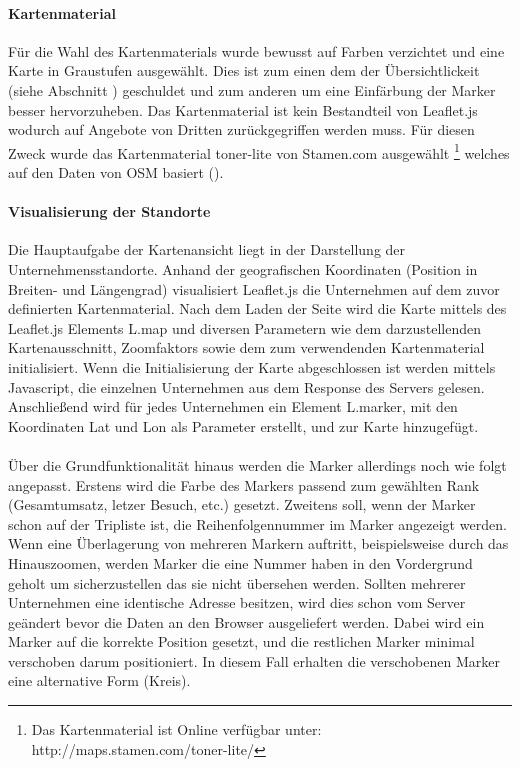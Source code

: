 \documentclass[Bachelorarbeit.tex]{subfiles}
\begin{document}
\paragraph{Kartenmaterial}
Für die Wahl des Kartenmaterials wurde bewusst auf Farben verzichtet und eine Karte in Graustufen ausgewählt. 
Dies ist zum einen dem der Übersichtlickeit (siehe Abschnitt ) geschuldet und zum anderen um eine Einfärbung der Marker besser hervorzuheben.
Das Kartenmaterial ist kein Bestandteil von Leaflet.js wodurch auf Angebote von Dritten zurückgegriffen werden muss.
Für diesen Zweck wurde das Kartenmaterial toner-lite von Stamen.com ausgewählt
	\footnote{Das Kartenmaterial ist Online verfügbar unter: http://maps.stamen.com/toner-lite/}  
welches auf den Daten von \ac{OSM} basiert (\cite[vgl.][]{Stamen}). 


\paragraph{Visualisierung der Standorte}
Die Hauptaufgabe der Kartenansicht liegt in der Darstellung der Unternehmensstandorte.
Anhand der geografischen Koordinaten (Position in Breiten- und Längengrad) visualisiert Leaflet.js die Unternehmen auf dem zuvor definierten Kartenmaterial. 
Nach dem Laden der Seite wird die Karte mittels des Leaflet.js Elements L.map und diversen Parametern wie dem darzustellenden Kartenausschnitt, Zoomfaktors sowie dem zum verwendenden Kartenmaterial initialisiert.
Wenn die Initialisierung der Karte abgeschlossen ist werden mittels Javascript, die einzelnen Unternehmen aus dem Response des Servers gelesen. 
Anschließend wird für jedes Unternehmen ein Element L.marker, mit den Koordinaten Lat und Lon als Parameter erstellt, und zur Karte hinzugefügt. \\
\\
Über die Grundfunktionalität hinaus werden die Marker allerdings noch wie folgt angepasst.
Erstens wird die Farbe des Markers passend zum gewählten Rank (Gesamtumsatz, letzer Besuch, etc.) gesetzt.
Zweitens soll, wenn der Marker schon auf der Tripliste ist, die Reihenfolgennummer im Marker angezeigt werden.
Wenn eine Überlagerung von mehreren Markern auftritt, beispielsweise durch das Hinauszoomen, werden Marker die eine Nummer haben in den Vordergrund geholt um sicherzustellen das sie nicht übersehen werden.
Sollten mehrerer Unternehmen eine identische Adresse besitzen, wird dies schon vom Server geändert bevor die Daten an den Browser ausgeliefert werden.
Dabei wird ein Marker auf die korrekte Position gesetzt, und die restlichen Marker minimal verschoben darum positioniert.
In diesem Fall erhalten die verschobenen Marker eine alternative Form (Kreis).
\end{document}
